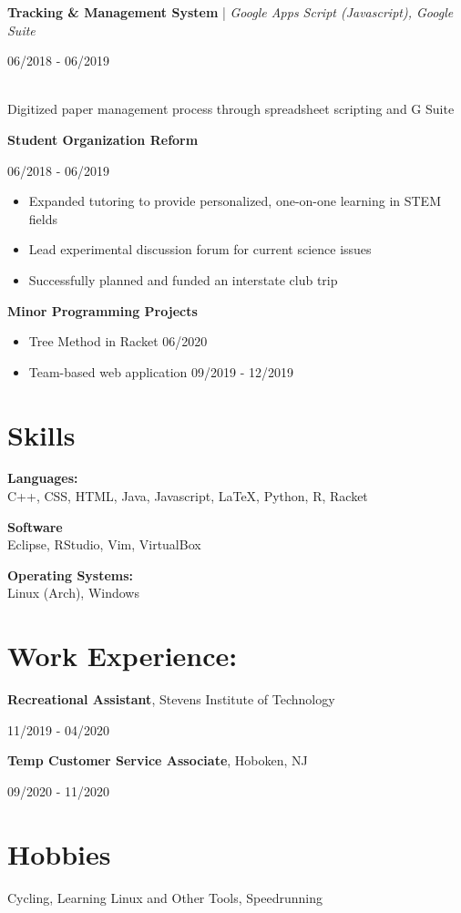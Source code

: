 \documentclass[11pt,letterpaper]{article}
\begin{document}
    \textbf{Tracking \& Management System} | \textit{Google Apps Script (Javascript), Google Suite}\hfill
      \begin{minipage}[t]{1.2in}
        06/2018 - 06/2019
      \end{minipage} \\
      Digitized paper management process through spreadsheet scripting and G Suite
    
    \textbf{Student Organization Reform}\hfill
      \begin{minipage}[t]{1.2in}
        06/2018 - 06/2019
      \end{minipage} 
      
      \begin{itemize}
        \item Expanded tutoring to provide personalized, one-on-one learning in STEM fields
        \item Lead experimental discussion forum for current science issues
        \item Successfully planned and funded an interstate club trip
      \end{itemize}
    
    \textbf{Minor Programming Projects}\hfill
    \begin{itemize}
      \item Tree Method in Racket \hfill 06/2020
      \item Team-based web application \hfill 09/2019 - 12/2019
    \end{itemize}
    

  \section{Skills}
    \textbf{Languages:}\\
    C++, CSS, HTML, Java, Javascript, LaTeX, Python, R, Racket
    
    \begin{minipage}[t]{2.5in}
      \textbf{Software}\\
      Eclipse, RStudio, Vim, VirtualBox
    \end{minipage}\hfill
    \begin{minipage}[t]{1.6in}
      \textbf{Operating Systems:}\\
      Linux (Arch), Windows
    \end{minipage}
    
  \section{Work Experience:}
    \textbf{Recreational Assistant}, Stevens Institute of Technology\hfill
    \begin{minipage}[t]{1.2in}
      11/2019 - 04/2020
    \end{minipage}
    
    \textbf{Temp Customer Service Associate}, Hoboken, NJ \hfill
    \begin{minipage}[t]{1.2in}
      09/2020 - 11/2020
    \end{minipage}
    
  \section{Hobbies}
    Cycling, Learning Linux and Other Tools, Speedrunning
    
\end{document}
